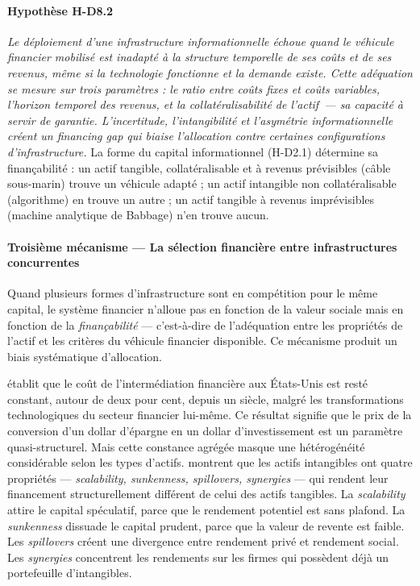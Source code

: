 \paragraph{Hypothèse H-D8.2} \emph{Le déploiement d'une infrastructure informationnelle échoue quand le véhicule financier mobilisé est inadapté à la structure temporelle de ses coûts et de ses revenus, même si la technologie fonctionne et la demande existe. Cette adéquation se mesure sur trois paramètres : le ratio entre coûts fixes et coûts variables, l'horizon temporel des revenus, et la collatéralisabilité de l'actif~--- sa capacité à servir de garantie. L'incertitude, l'intangibilité et l'asymétrie informationnelle créent un \emph{financing gap} \parencite{hall_financing_2010} qui biaise l'allocation contre certaines configurations d'infrastructure.} La forme du capital informationnel (H-D2.1) détermine sa finançabilité : un actif tangible, collatéralisable et à revenus prévisibles (câble sous-marin) trouve un véhicule adapté ; un actif intangible non collatéralisable (algorithme) en trouve un autre ; un actif tangible à revenus imprévisibles (machine analytique de Babbage) n'en trouve aucun.

\paragraph{Troisième mécanisme --- La sélection financière entre infrastructures concurrentes}

Quand plusieurs formes d'infrastructure sont en compétition pour le même capital, le système financier n'alloue pas en fonction de la valeur sociale mais en fonction de la \emph{finançabilité} --- c'est-à-dire de l'adéquation entre les propriétés de l'actif et les critères du véhicule financier disponible. Ce mécanisme produit un biais systématique d'allocation.

\markNEO \textcite{philippon_has_2015} établit que le coût de l'intermédiation financière aux États-Unis est resté constant, autour de deux pour cent, depuis un siècle, malgré les transformations technologiques du secteur financier lui-même. Ce résultat signifie que le prix de la conversion d'un dollar d'épargne en un dollar d'investissement est un paramètre quasi-structurel. Mais cette constance agrégée masque une hétérogénéité considérable selon les types d'actifs. \textcite{haskel_capitalism_2018} montrent que les actifs intangibles ont quatre propriétés --- \emph{scalability, sunkenness, spillovers, synergies} --- qui rendent leur financement structurellement différent de celui des actifs tangibles. La \emph{scalability} attire le capital spéculatif, parce que le rendement potentiel est sans plafond. La \emph{sunkenness} dissuade le capital prudent, parce que la valeur de revente est faible. Les \emph{spillovers} créent une divergence entre rendement privé et rendement social. Les \emph{synergies} concentrent les rendements sur les firmes qui possèdent déjà un portefeuille d'intangibles.

